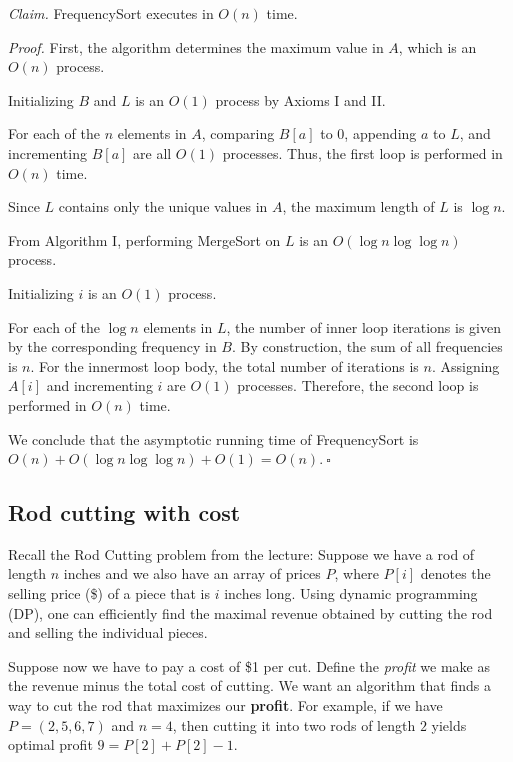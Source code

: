\begin{enumerate}
\begin{solution}
\textit{Claim. }{\sc FrequencySort} executes in $O(n)$ time.

\textit{Proof. }First, the algorithm determines the maximum value in $A$, which is an $O(n)$ process.

Initializing $B$ and $L$ is an $O(1)$ process by Axioms I and II.

For each of the $n$ elements in $A$, comparing $B[a]$ to $0$, appending $a$ to $L$, and incrementing $B[a]$ are all $O(1)$ processes. Thus, the first loop is performed in $O(n)$ time.

Since $L$ contains only the unique values in $A$, the maximum length of $L$ is $\log n$.

From Algorithm I, performing {\sc MergeSort} on $L$ is an $O(\log n\log\log n)$ process.

Initializing $i$ is an $O(1)$ process.

For each of the $\log n$ elements in $L$, the number of inner loop iterations is given by the corresponding frequency in $B$. By construction, the sum of all frequencies is $n$. For the innermost loop body, the total number of iterations is $n$. Assigning $A[i]$ and incrementing $i$ are $O(1)$ processes. Therefore, the second loop is performed in $O(n)$ time.

We conclude that the asymptotic running time of {\sc FrequencySort} is $O(n)+O(\log n\log\log n)+O(1)=O(n)$.$~\square$
\end{solution}
\end{enumerate}
\newpage
\subsection{Rod cutting with cost}
Recall the Rod Cutting problem from the lecture: Suppose we have a rod of length $n$ inches and we also have an array of prices $P$, where $P[i]$ denotes the selling price (\$) of a piece that is $i$ inches long. Using dynamic programming (DP), one can efficiently find the maximal revenue obtained by cutting the rod and selling the individual pieces. 

Suppose now we have to pay a cost of \$1 per cut. Define the \emph{profit} we make as the revenue minus the total cost of cutting. We want an algorithm that finds a way to cut the rod that maximizes our \textbf{profit}. For example, if we have $P = (2,5,6,7)$ and $n=4$, then cutting it into two rods of length $2$ yields optimal profit $9=P[2]+P[2]-1$.


